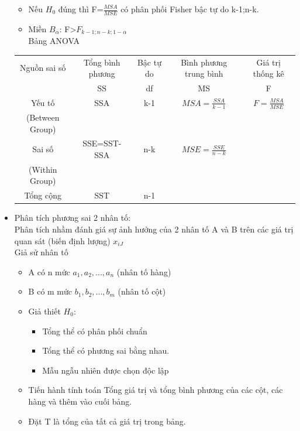 \documentclass[a4paper]{article}
\theoremstyle{definition}
\begin{document}
\begin{itemize}
\begin{itemize}
     \item Nếu $H_0$ đúng thì F=$\frac{MSA}{MSE}$ có phân phối Fisher bậc tự do k-1;n-k.\\
     \item Miền $B_\alpha$: F>$F_{k-1;n-k;1-\alpha}$\\
     Bảng ANOVA
    \end{itemize}
    
    \begin{tabular}{|c|c|c|c|c|}
         \hline
         Nguồn sai số & Tổng bình phương & Bậc tự do & Bình phương trung bình & Giá trị thống kê \\
          & SS & df & MS & F\\
         \hline
         Yếu tố & SSA & k-1 & $MSA=\frac{SSA}{k-1}$ & $F=\frac{MSA}{MSE}$\\
         (Between Group) & & & & \\
         \hline
         Sai số & SSE=SST-SSA & n-k & $MSE=\frac{SSE}{n-k}$ & \\
         (Within Group) & & & & \\
         \hline
         Tổng cộng & SST & n-1 & & \\
         \hline
         \end{tabular}
    \item Phân tích phương sai 2 nhân tố:\\
    Phân tích nhầm đánh giá sự ảnh hưởng của 2 nhân tố A và B trên các giá trị quan sát (biến định lượng) $x_{iJ}$\\
    Giả sử nhân tố
    \begin{itemize}
        \item  A có n mức $a_1,a_2,...,a_n$ (nhân tố hàng)\\
        \item B có m mức $b_1, b_2,..., b_m$ (nhân tố cột)
    \end{itemize}
   \begin{itemize}
       \item Giả thiết $H_0$:
       \begin{itemize}
           \item Tổng thể có phân phối chuẩn
           \item Tổng thể có phương sai bằng nhau.
           \item Mẫu ngẫu nhiên được chọn độc lập
       \end{itemize}
       \item Tiến hành tính toán Tổng giá trị và tổng bình phương của các cột, các hàng và thêm vào cuối bảng.
           \item Đặt T là tổng của tất cả giá trị trong bảng.
           

\end{itemize}
\end{itemize}
\end{document}
